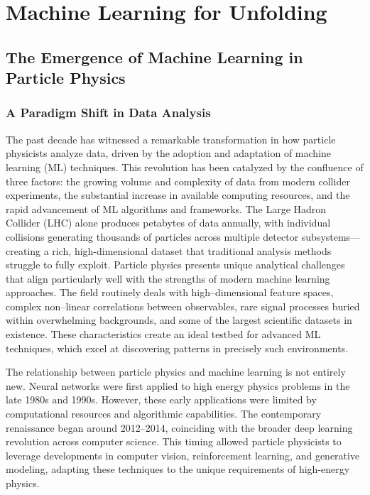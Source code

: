 \chapter{Machine Learning for Unfolding}
\label{chap:ml-for-unfolding}
\section{The Emergence of Machine Learning in Particle Physics}
\subsection{A Paradigm Shift in Data Analysis}
The past decade has witnessed a remarkable transformation in how particle physicists analyze data, driven by the adoption and adaptation of machine learning (ML) techniques.
%
This revolution has been catalyzed by the confluence of three factors: the growing volume and complexity of data from modern collider experiments, the substantial increase in available computing resources, and the rapid advancement of ML algorithms and frameworks.
%
The Large Hadron Collider (LHC) alone produces petabytes of data annually, with individual collisions generating thousands of particles across multiple detector subsystems—creating a rich, high-dimensional dataset that traditional analysis methods struggle to fully exploit.
%
Particle physics presents unique analytical challenges that align particularly well with the strengths of modern machine learning approaches.
%
The field routinely deals with high--dimensional feature spaces, complex non--linear correlations between observables, rare signal processes buried within overwhelming backgrounds, and some of the largest scientific datasets in existence.
%
These characteristics create an ideal testbed for advanced ML techniques, which excel at discovering patterns in precisely such environments.
%

The relationship between particle physics and machine learning is not entirely new.
%
Neural networks were first applied to high energy physics problems in the late 1980s and 1990s.
%
However, these early applications were limited by computational resources and algorithmic capabilities.
%
The contemporary renaissance began around 2012--2014, coinciding with the broader deep learning revolution across computer science.
%
This timing allowed particle physicists to leverage developments in computer vision, reinforcement learning, and generative modeling, adapting these techniques to the unique requirements of high-energy physics.
